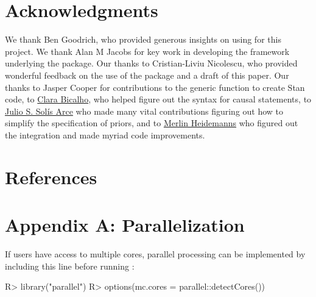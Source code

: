 \documentclass[
  11pt,
  article]{jss}
\renewcommand{\texttt}[1]{\code{#1}}
\begin{document}
\section*{Acknowledgments}\label{acknowledgments}

\begin{tcolorbox}[enhanced jigsaw, colframe=quarto-callout-color-frame, toprule=.15mm, bottomrule=.15mm, arc=.35mm, rightrule=.15mm, breakable, leftrule=.75mm, opacityback=0, left=2mm, colback=white]

We thank Ben Goodrich, who provided generous insights on using
\texttt{stan} for this project. We thank Alan M Jacobs for key work in
developing the framework underlying the package. Our thanks to
Cristian-Liviu Nicolescu, who provided wonderful feedback on the use of
the package and a draft of this paper. Our thanks to Jasper Cooper for
contributions to the generic function to create Stan code, to
\href{https://clarabicalho.github.io/}{Clara Bicalho}, who helped figure
out the syntax for causal statements, to
\href{https://www.gov.harvard.edu/directory/julio-s-solis-arce/}{Julio
S. Solís Arce} who made many vital contributions figuring out how to
simplify the specification of priors, and to
\href{https://merlinheidemanns.github.io/website/}{Merlin Heidemanns}
who figured out the \texttt{rstantools} integration and made myriad code
improvements.

\end{tcolorbox}

\section*{References}\label{references}

\renewcommand{\bibsection}{}


\newpage{}

\section*{Appendix A: Parallelization}\label{sec-parallel}

If users have access to multiple cores, parallel processing can be
implemented by including this line before running :

\begin{CodeInput}
R> library("parallel")
R> options(mc.cores = parallel::detectCores())
\end{CodeInput}
\end{document}
